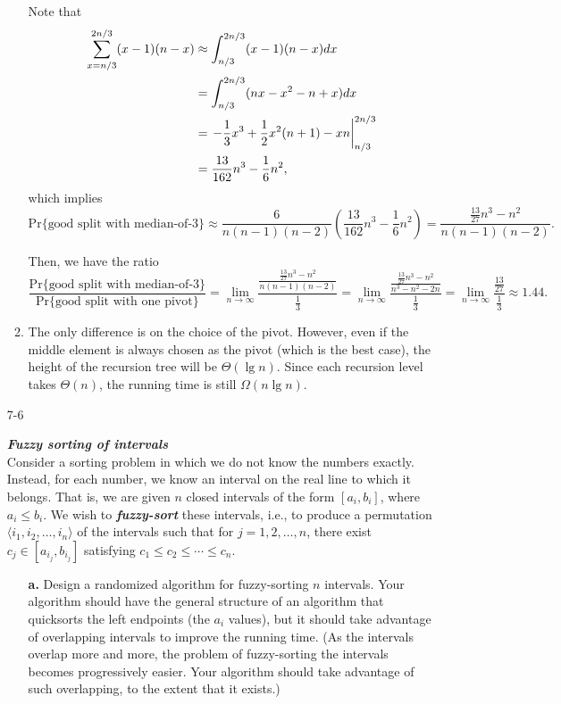 \begin{enumerate}
\begin{framed}
\begin{enumerate}
{Note that
\begin{equation*}
\begin{aligned}
\sum_{x = n/3}^{2n/3} (x - 1) (n - x)
&\approx \int_{n/3}^{2n/3} (x - 1) (n - x) dx\\
&= \int_{n/3}^{2n/3} (nx -x^2 - n + x) dx\\
&= \left.-\frac{1}{3} x^3 + \frac{1}{2} x^2 (n + 1) - xn\right\rvert_{n/3}^{2n/3}\\
&= \frac{13}{162} n^3 - \frac{1}{6} n^2,
\end{aligned}
\end{equation*}
which implies
\[
 \text{Pr}\{\text{good split with median-of-3}\} \approx \frac{6}{n (n - 1)(n - 2)} \left( \frac{13}{162} n^3 - \frac{1}{6} n^2 \right)
= \frac{\frac{13}{27} n^3 - n^2}{n (n - 1) (n - 2)}.
\]

Then, we have the ratio
\[
\frac{\text{Pr}\{\text{good split with median-of-3}\}}{\text{Pr}\{\text{good split with one pivot}\}}
= \lim_{n\to\infty} \frac{\frac{\frac{13}{27} n^3 - n^2}{n (n - 1) (n - 2)}}{\frac{1}{3}}
= \lim_{n\to\infty} \frac{\frac{\frac{13}{27} n^3 - n^2}{n^3 - n^2 - 2n}}{\frac{1}{3}}
= \lim_{n\to\infty} \frac{\frac{13}{27}}{\frac{1}{3}} \approx 1.44.
\]

}
\item{The only difference is on the choice of the pivot. However, even if the
middle element is always chosen as the pivot (which is the best case), the
height of the recursion tree will be $\Theta(\lg n)$. Since each recursion level
takes $\Theta(n)$, the running time is still $\Omega(n \lg n)$.}
\end{enumerate}
\end{framed}

\newpage

\item[7{-}6]{\textbf{\emph{Fuzzy sorting of intervals}}\\
Consider a sorting problem in which we do not know the numbers exactly. Instead,
for each number, we know an interval on the real line to which it belongs.
That is, we are given $n$ closed intervals of the form $[a_i, b_i]$, where
$a_i \le b_i$. We wish to \textbf{\emph{fuzzy-sort}} these intervals, i.e., to
produce a permutation $\langle i_1, i_2, \dots, i_n \rangle$ of the intervals
such that for $j = 1, 2, \dots, n$, there exist $c_j \in [a_{i_j}, b_{i_j}]$
satisfying $c_1 \le c_2 \le \cdots \le c_n$.

\begin{enumerate}
\item[\textbf{a.}]{Design a randomized algorithm for fuzzy-sorting $n$
intervals.  Your algorithm should have the general structure of an algorithm
that quicksorts the left endpoints (the $a_i$ values), but it should take
advantage of overlapping intervals to improve the running time. (As the
intervals overlap more and more, the problem of fuzzy-sorting the intervals
becomes progressively easier. Your algorithm should take advantage of such
overlapping, to the extent that it exists.)}


\end{enumerate}}
\end{enumerate}
